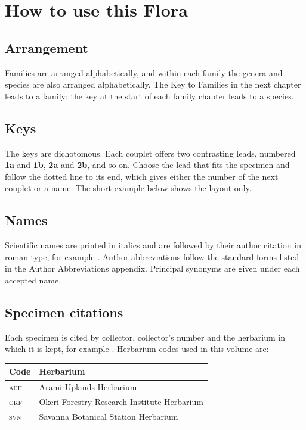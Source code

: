 \chapter{How to use this Flora}

\section*{Arrangement}
Families are arranged alphabetically, and within each family the
genera and species are also arranged alphabetically. The Key to
Families in the next chapter leads to a family; the key at the start
of each family chapter leads to a species.

\section*{Keys}
The keys are dichotomous. Each couplet offers two contrasting leads,
numbered \textbf{1a} and \textbf{1b}, \textbf{2a} and \textbf{2b}, and
so on. Choose the lead that fits the specimen and follow the dotted
line to its end, which gives either the number of the next couplet or
a name. The short example below shows the layout only.

\begin{florakey}
\end{florakey}

\section*{Names}
Scientific names are printed in italics and are followed by their
author citation in roman type, for example
. Author abbreviations
follow the standard forms listed in the Author Abbreviations
appendix. Principal synonyms are given under each accepted name.

\section*{Specimen citations}
Each specimen is cited by collector, collector's number and the
herbarium in which it is kept, for example
. Herbarium codes used in this volume are:

\medskip
\begin{tabular}{@{}ll@{}}
	\toprule
	Code & Herbarium \\
	\midrule
	\textsc{auh} & Arami Uplands Herbarium \\
	\textsc{okf} & Okeri Forestry Research Institute Herbarium \\
	\textsc{svn} & Savanna Botanical Station Herbarium \\
	\bottomrule
\end{tabular}

